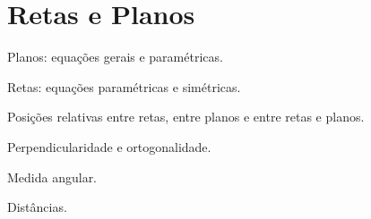\chapter{Retas e Planos}

Planos: equações gerais e paramétricas.

Retas: equações paramétricas e simétricas.

Posições relativas entre retas, entre planos e entre retas e planos.

Perpendicularidade e ortogonalidade.

Medida angular.

Distâncias.

